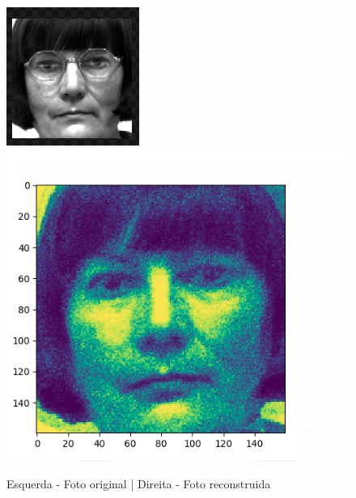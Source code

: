 \documentclass[a4paper, 12pt]{article}
\begin{document}
    \begin{figure}[ht]
     \centering
     \includegraphics[scale=0.8]{original.png}
     \includegraphics[scale=0.33]{reconstruida.png}
     \caption{Esquerda - Foto original | Direita - Foto reconstruida }
    \end{figure}
    
    
    
\end{document}
